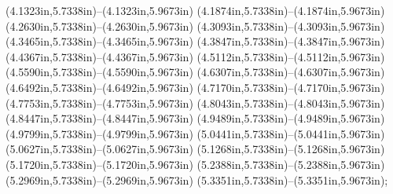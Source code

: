 (4.1323in,5.7338in)--(4.1323in,5.9673in) (4.1874in,5.7338in)--(4.1874in,5.9673in) (4.2630in,5.7338in)--(4.2630in,5.9673in) (4.3093in,5.7338in)--(4.3093in,5.9673in) (4.3465in,5.7338in)--(4.3465in,5.9673in) (4.3847in,5.7338in)--(4.3847in,5.9673in) (4.4367in,5.7338in)--(4.4367in,5.9673in) (4.5112in,5.7338in)--(4.5112in,5.9673in) (4.5590in,5.7338in)--(4.5590in,5.9673in) (4.6307in,5.7338in)--(4.6307in,5.9673in) (4.6492in,5.7338in)--(4.6492in,5.9673in) (4.7170in,5.7338in)--(4.7170in,5.9673in) (4.7753in,5.7338in)--(4.7753in,5.9673in) (4.8043in,5.7338in)--(4.8043in,5.9673in) (4.8447in,5.7338in)--(4.8447in,5.9673in) (4.9489in,5.7338in)--(4.9489in,5.9673in) (4.9799in,5.7338in)--(4.9799in,5.9673in) (5.0441in,5.7338in)--(5.0441in,5.9673in) (5.0627in,5.7338in)--(5.0627in,5.9673in) (5.1268in,5.7338in)--(5.1268in,5.9673in) (5.1720in,5.7338in)--(5.1720in,5.9673in) (5.2388in,5.7338in)--(5.2388in,5.9673in) (5.2969in,5.7338in)--(5.2969in,5.9673in) (5.3351in,5.7338in)--(5.3351in,5.9673in);
